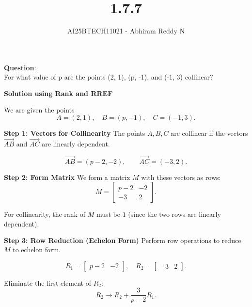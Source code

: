 \documentclass[journal]{IEEEtran}
\begin{document}

\vspace{3cm}

\title{1.7.7}
\author{AI25BTECH11021 - Abhiram Reddy N}
{\let\newpage\relax\maketitle}

\renewcommand{\thefigure}{\theenumi}
\renewcommand{\thetable}{\theenumi}
\setlength{\intextsep}{10pt} %


\renewcommand{\thetable}{\theenumi}


\textbf{Question}:\\For what value of p are the points (2, 1), (p, -1), and (-1, 3) collinear?


\textbf{Solution using Rank and RREF}

We are given the points
\[
A = (2,1), \quad B = (p,-1), \quad C = (-1,3).
\]

\textbf{Step 1: Vectors for Collinearity}
The points $A, B, C$ are collinear if the vectors 
\(\overrightarrow{AB}\) and \(\overrightarrow{AC}\) are linearly dependent.  

\[
\overrightarrow{AB} = (p-2, -2), \qquad 
\overrightarrow{AC} = (-3,2).
\]

\textbf{Step 2: Form Matrix}
We form a matrix $M$ with these vectors as rows:
\[
M = \begin{bmatrix}
p-2 & -2 \\
-3 & 2
\end{bmatrix}.
\]

For collinearity, the rank of $M$ must be $1$ (since the two rows are linearly dependent).

\textbf{Step 3: Row Reduction (Echelon Form)}
Perform row operations to reduce $M$ to echelon form.

\[
R_1 = \begin{bmatrix} p-2 & -2 \end{bmatrix}, 
\quad R_2 = \begin{bmatrix} -3 & 2 \end{bmatrix}.
\]

Eliminate the first element of $R_2$:
\[
R_2 \to R_2 + \frac{3}{p-2} R_1.
\]
\end{document}
